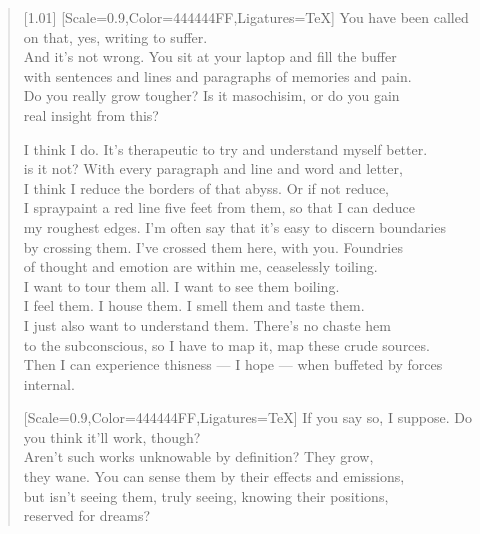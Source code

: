 \begin{verse}[1.01\textwidth]
  {[Scale=0.9,Color=444444FF,Ligatures=TeX]
  \vin You have been called on that, yes, writing to suffer.\\
  \vin And it's not wrong. You sit at your laptop and fill the buffer\\
  \vin with sentences and lines and paragraphs of memories and pain.\\
  \vin Do you really grow tougher? Is it masochisim, or do you gain\\
  \vin real insight from this?}

  I think I do. It's therapeutic to try and understand myself better.\\
  is it not? With every paragraph and line and word and letter,\\
  I think I reduce the borders of that abyss. Or if not reduce,\\
  I spraypaint a red line five feet from them, so that I can deduce\\
  my roughest edges. I'm often say that it's easy to discern boundaries\\
  by crossing them. I've crossed them here, with you. Foundries\\
  of thought and emotion are within me, ceaselessly toiling.\\
  I want to tour them all. I want to see them boiling.\\
  I feel them. I house them. I smell them and taste them.\\
  I just also want to understand them. There's no chaste hem\\
  to the subconscious, so I have to map it, map these crude sources.\\
  Then I can experience thisness --- I hope --- when buffeted by forces\\
  internal.

  {[Scale=0.9,Color=444444FF,Ligatures=TeX]
  \vin If you say so, I suppose. Do you think it'll work, though?\\
  \vin Aren't such works unknowable by definition? They grow,\\
  \vin they wane. You can sense them by their effects and emissions,\\
  \vin but isn't seeing them, truly seeing, knowing their positions,\\
  \vin reserved for dreams?}
\end{verse}
\newpage

